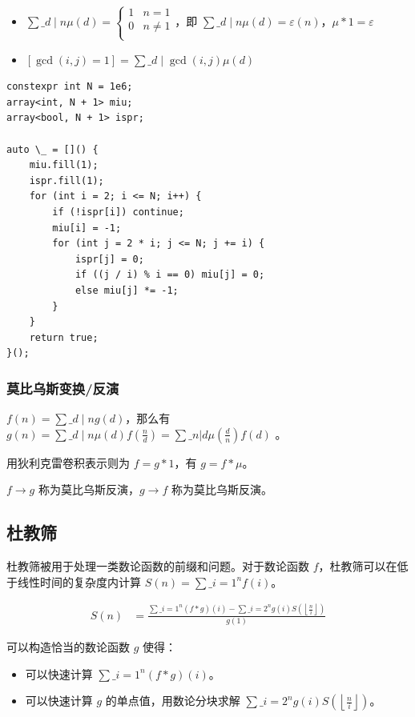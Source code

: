 \documentclass[UTF8]{ctexart}
\begin{document}
\begin{sloppypar}
\begin{itemize}
   \item $\sum\_{d\mid n}\mu(d)=\begin{cases}1&n=1\\0&n\neq 1\\\end{cases}$，即 $\sum\_{d\mid n}\mu(d)=\varepsilon(n)$，$\mu * 1 =\varepsilon$
   \item $\displaystyle [\gcd(i,j)=1]=\sum\_{d\mid\gcd(i,j)}\mu(d)$
\end{itemize}

\begin{lstlisting}[style=cpp]
constexpr int N = 1e6;
array<int, N + 1> miu;
array<bool, N + 1> ispr;

auto \_ = []() {
    miu.fill(1);
    ispr.fill(1);
    for (int i = 2; i <= N; i++) {
        if (!ispr[i]) continue;
        miu[i] = -1;
        for (int j = 2 * i; j <= N; j += i) {
            ispr[j] = 0;
            if ((j / i) % i == 0) miu[j] = 0;
            else miu[j] *= -1;
        }
    }
    return true;
}();
\end{lstlisting}

\subsubsection{莫比乌斯变换/反演}

$f(n)=\sum\_{d\mid n}g(d)$，那么有 $g(n)=\sum\_{d\mid n}\mu(d)f(\frac{n}{d})=\sum\_{n|d}\mu(\frac{d}{n})f(d)$
。

用狄利克雷卷积表示则为 $f=g\ast1$，有 $g=f\ast\mu$。

$f \rightarrow g$ 称为莫比乌斯反演，$g \rightarrow f$ 称为莫比乌斯反演。

\subsection{杜教筛}

杜教筛被用于处理一类数论函数的前缀和问题。对于数论函数 $f$，杜教筛可以在低于线性时间的复杂度内计算 $S(n)=\sum\_{i=1}^{n}f(i)$。

$$
\begin{aligned}
    S(n) & = \frac{\sum\_{i=1}^n (f * g)(i) - \sum\_{i=2}^n g(i)S\left(\left\lfloor\frac{n}{i}\right\rfloor\right)}{g(1)}
\end{aligned}
$$

可以构造恰当的数论函数 $g$ 使得：

\begin{itemize}
   \item 可以快速计算 $\sum\_{i=1}^n(f * g)(i)$。
   \item 可以快速计算 $g$ 的单点值，用数论分块求解 $\sum\_{i=2}^ng(i)S\left(\left\lfloor\frac{n}{i}\right\rfloor\right)$。
\end{itemize}


\end{sloppypar}
\end{document}
